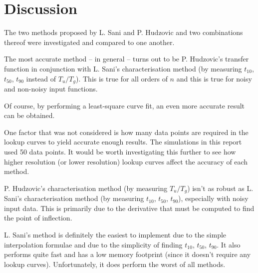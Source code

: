 \section{Discussion}

The two methods proposed by L. Sani and P. Hudzovic and two combinations thereof
were investigated and compared to one another.

The most accurate method -- in general -- turns out to be P. Hudzovic's transfer
function in conjunction with L. Sani's  characterisation  method  (by  measuring
$t_{10}$, $t_{50}$, $t_{90}$ instead of $T_u/T_g$). This  is true for all orders
of  $n$  and  this  is  true  for   noisy   and   non-noisy   input   functions.

Of course,  by performing a least-square curve fit, an even more accurate result
can be obtained.

One factor that was not  considered  is how many data points are required in the
lookup  curves  to yield accurate enough results. The simulations in this report
used  50  data  points. It would be worth investigating this further to see  how
higher resolution (or  lower  resolution)  lookup  curves affect the accuracy of
each method.

P.  Hudzovic's  characterisation method (by measuring $T_u/T_g$) isn't as robust
as  L.  Sani's   characterisation   method  (by  measuring  $t_{10}$,  $t_{50}$,
$t_{90}$),  especially  with  noisy  input data. This is primarily  due  to  the
derivative  that  must  be  computed  to   find   the   point   of   inflection.

L. Sani's method is definitely  the  easiest  to  implement  due  to  the simple
interpolation formulae and due to  the simplicity of finding $t_{10}$, $t_{50}$,
$t_{90}$. It also performs quite  fast  and has a low memory footprint (since it
doesn't require any lookup curves).  Unfortunately, it does perform the worst of
all methods.

